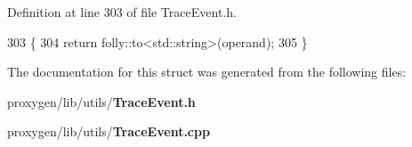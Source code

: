 Definition at line 303 of file Trace\+Event.\+h.


\begin{DoxyCode}
303                                          \{
304     \textcolor{keywordflow}{return} folly::to<std::string>(operand);
305   \}
\end{DoxyCode}


The documentation for this struct was generated from the following files\+:\begin{DoxyCompactItemize}
\item 
proxygen/lib/utils/{\bf Trace\+Event.\+h}\item 
proxygen/lib/utils/{\bf Trace\+Event.\+cpp}\end{DoxyCompactItemize}

